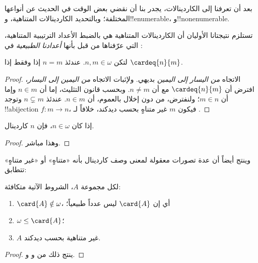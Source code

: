 \documentclass[../../../include/open-logic-section]{subfiles}
\begin{document}

بعد أن تعرفنا إلى الكاردينالات، يجدر بنا أن نقضي بعض الوقت في الحديث عن
أنواعها المختلفة؛ وبالتحديد الكاردينالات المتناهية، و!!{enumerable}،
و!!{nonenumerable}.

تستلزم نتيجتانا الأوليان أن الكاردينالات المتناهية هي بالضبط الأعداد
الترتيبية المتناهية، التي عرّفناها من قبل بأنها \emph{أعدادنا الطبيعية}
في :

\begin{prop}
لتكن $n, m \in \omega$. عندئذ $n = m$ إذا وفقط إذا
$\cardeq{n}{m}$.
\end{prop}

\begin{proof}
الاتجاه \emph{من اليسار إلى اليمين} بديهي. ولإثبات الاتجاه
\emph{من اليمين إلى اليسار}، افترض أن $\cardeq{n}{m}$ مع أن
$n \neq m$. وبحسب قانون التثليث، إما أن $n \in m$ وإما أن
$m \in n$؛ ولنفترض، من دون إخلال بالعموم، أن $n \in m$. عندئذ
$n \subsetneq m$ وتوجد !!a{bijection} $f \colon m \to n$، فيكون
$m$ غير متناهٍ بحسب ديدكند، خلافاً لـ
.
\end{proof}

\begin{cor}
إذا كان $n \in \omega$، فإن $n$ كاردينال.
\end{cor}

\begin{proof}
وهذا مباشر.
\end{proof}
\noindent
وينتج أيضاً أن عدة تصورات معقولة لمعنى وصف كاردينال بأنه «متناهٍ» أو
«غير متناهٍ» تتطابق:
\begin{thm}لكل مجموعة $A$، الشروط الآتية متكافئة:
\begin{enumerate}
	\item{} $\card{A} \notin \omega$، أي إن
	$\card{A}$ ليس عدداً طبيعياً؛
	\item{} $\omega \leq \card{A}$؛
	\item{} $A$ غير متناهية بحسب ديدكند.
\end{enumerate}
\end{thm}

\begin{proof}
ينتج ذلك من 
و
و.
\end{proof}
\end{document}
